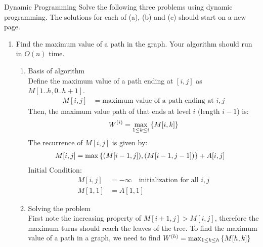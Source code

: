 \documentclass{article}
\numberwithin{table}{section}
\numberwithin{figure}{section}
\begin{document}
\begin{section}{Dynamic Programming}
Solve the following three problems using dynamic programming. The solutions for each of (a), (b) and (c) should start on a new page. 
\begin{enumerate}
    \newpage
    \item Find the maximum value of a path in the graph. Your algorithm should run in $O(n)$ time.
    \begin{tcolorbox}[breakable]
        \begin{enumerate}
            \item Basis of algorithm \\
            Define the maximum value of a path ending at $[i,j]$ as $M[1..h, 0..h+1]$.
            \begin{align*}
                M[i,j] &= \text{maximum value of a path ending at $i,j$}
            \end{align*}
            Then, the maximum value path of that ends at level $i$ (length $i-1$) is:
            \begin{align*}
                W^{\left(i\right)} = \max_{1 \leq k \leq i}\left\{M[i, k]\right\}
            \end{align*}
            The recurrence of $M[i, j]$ is given by:
            \begin{align*}
                M[i, j] &= \max \left\{(M[i-1, j]), (M[i-1, j-1])\right\} + A[i, j]
            \end{align*}
            Initial Condition:
            \begin{align*}
                M[i, j] &= -\infty \quad \text{initialization for all $i, j$}\\
                M[1, 1] &= A[1, 1]
            \end{align*}
            
            \item Solving the problem \\
            First note the increasing property of $M[i+1, j] > M[i, j]$, therefore the maximum turns should reach the leaves of the tree. 
            To find the maximum value of a path in a graph, we need to find $W^{\left(h\right)} = \max_{1 \leq k \leq h}\left\{M[h, k]\right\}$
            

\end{enumerate}
\end{tcolorbox}
\end{enumerate}
\end{section}
\end{document}
